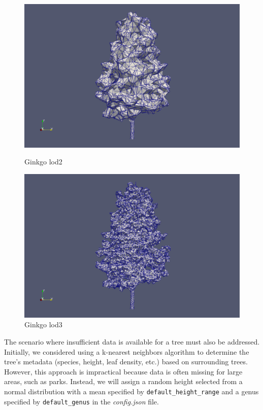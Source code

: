 \documentclass[12pt]{article}
\begin{document}
\begin{figure}[H]
    \centering
    \begin{minipage}{0.45\textwidth}
        \centering
        \includegraphics[width=1\textwidth]{images/gingko_lod2.png}
        \caption{Ginkgo lod2}
    \end{minipage}\hfill
    \begin{minipage}{0.45\textwidth}
        \centering
        \includegraphics[width=1\textwidth]{images/gingko_lod3.png}
        \caption{Ginkgo lod3}
    \end{minipage}
\end{figure}

The scenario where insufficient data is available for a tree must also be
addressed. Initially, we considered using a k-nearest neighbors
algorithm\cite{k-nn} to determine the tree's metadata (species, height,
leaf density, etc.) based on surrounding trees. However, this approach is
impractical because data is often missing for large areas, such as parks.
Instead, we will assign a random height selected from a normal distribution with
a mean specified by \texttt{default\_height\_range} and a genus specified by
\texttt{default\_genus} in the \textit{config.json} file.
\end{document}

